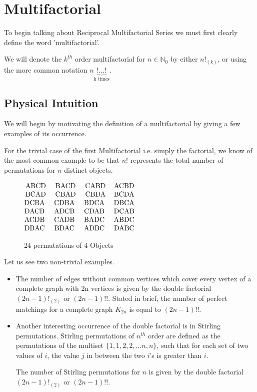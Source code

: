 \documentclass[12pt]{article}
\numberwithin{equation}{section}
\begin{document}
\section{Multifactorial} %

To begin talking about Reciprocal Multifactorial Series  we must first clearly define the word 'multifactorial'.\par
We will denote the $k^{th}$ order multifactorial for $n \in \mathbb{N}_0$  by either $n!_{(k)}$, or using the more common notation $n\underbrace{!\ldots!}_{\text{k times}}$.


\subsection{Physical Intuition}
We will begin by motivating the definition of a multifactorial by giving a few examples of its occurrence.\par
For the trivial case of the first Multifactorial i.e. simply the factorial, we know of the most common example to be that $n!$ represents the total number of permutations for $n$ distinct objects.
\begin{figure}[htp]
    \centering
    $\begin{matrix}
\textup{ABCD} & \textup{BACD} & \textup{CABD} & \textup{ACBD}\\ 
\textup{BCAD} & \textup{CBAD} & \textup{CBDA} & \textup{BCDA}\\ 
\textup{DCBA }& \textup{CDBA }& \textup{BDCA }& \textup{DBCA}\\ 
\textup{DACB }& \textup{ADCB }& \textup{CDAB }& \textup{DCAB}\\ 
\textup{ACDB }& \textup{CADB }& \textup{BADC }& \textup{ABDC}\\ 
\textup{DBAC }& \textup{BDAC }& \textup{ADBC }& \textup{DABC}
\end{matrix}$
    \caption{24 permutations of 4 Objects}
    \label{fig:permutations}
\end{figure}
\par
Let us see two non-trivial examples.
\begin{itemize}
\item The number of edges without common vertices which cover every vertex of a complete graph with 2n vertices is given by the double factorial $(2n-1)!_{(2)}$ or $(2n-1)!!$. Stated in brief, the number of perfect matchings for a complete graph $K_{2n}$ is equal to $(2n-1)!!$.\par
\item Another interesting occurrence of the double factorial is in Stirling permutations. Stirling permutations of $n^{th}$ order are defined as the permutations of the multiset $\{1, 1, 2, 2, \dots n, n\}$, such that for each set of two values of $i$, the value $j$ in between the two $i$'s is greater than $i$.\par
The number of Stirling permutations for $n$ is given by the double factorial $(2n-1)!_{(2)}$ or $(2n-1)!!$.\par
\end{itemize}
\end{document}
